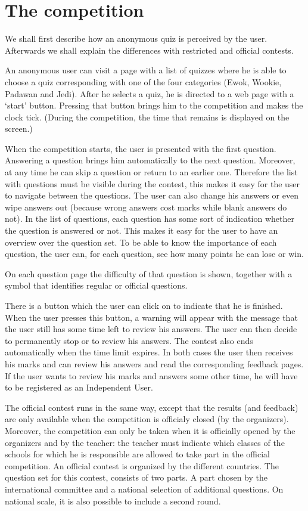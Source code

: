 \section{The competition}

We shall first describe how an anonymous quiz is perceived by the user. Afterwards we shall explain 
the differences with restricted and official contests.

An anonymous user can visit a page with a list of quizzes where he is able to choose a quiz corresponding 
with one of the four categories (Ewok, Wookie, Padawan and Jedi). After he selects a quiz, he is directed to a web page with a `start' button. Pressing that button 
brings him to the competition and makes the clock tick. (During the competition, the time that remains
is displayed on the screen.) 

When the competition starts, the user is presented with the first question. Answering a question brings
him automatically to the next question. Moreover, at any time he can skip a question or return to an earlier 
one. Therefore the list with questions must be visible during the contest, this makes it easy for the user
to navigate between the questions. The user can also change his answers or even wipe answers out (because 
wrong answers cost marks while blank answers do not). In the list of questions, each question has some 
sort of indication whether the question is answered or not. This makes it easy for the user to have an
overview over the question set. To be able to know the importance of each question, the user can, for each
question, see how many points he can lose or win. 

On each question page the difficulty of that question is shown, together with a symbol that identifies
regular or official questions.

There is a button which the user can click on to indicate that he is finished. When the user presses this 
button, a warning will appear with the message that the user still has some time left to review his
answers. The user can then decide to permanently stop or to review his answers. The contest also ends
automatically when the time limit expires. In both cases the user then receives his marks and can review his
answers and read the corresponding feedback pages. If the user wants to review his marks and answers some 
other time, he will have to be registered as an Independent User. 

The official contest runs in the same way, except that the results (and feedback) are only available
when the competition is officialy closed (by the organizers). Moreover, the competition can only be taken
when it is officially opened by the organizers and by the teacher: the teacher must indicate which classes
of the schools for which he is responsible are allowed to take part in the official competition. An official
contest is organized by the different countries. The question set for this contest, consists of two parts. 
A part chosen by the international committee and a national selection of additional questions. On national 
scale, it is also possible to include a second round. 

